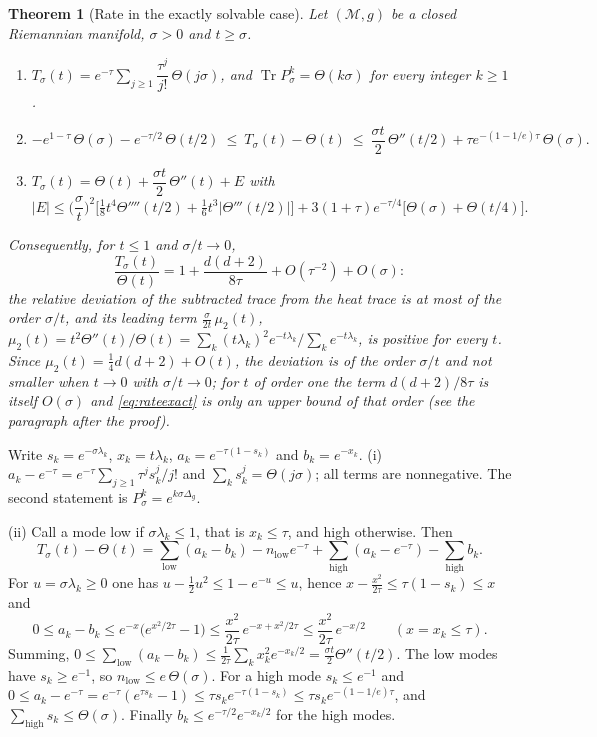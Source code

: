 \documentclass[11pt,a4paper]{article}
\makeatletter
\theoremstyle{stmt}
\newtheorem{theorem}{Theorem}[section]
\theoremstyle{defn}
\theoremstyle{rmk}
\renewenvironment{proof}[1][\proofname]{\par\pushQED{\qed}\normalfont\topsep6\p@\@plus6\p@\relax
  \trivlist\item[\hskip\labelsep{\sffamily\itshape\small #1.}]\ignorespaces}{\popQED\endtrivlist\@endpefalse}
\numberwithin{equation}{section}
\DeclareMathOperator{\Tr}{Tr}
\newcommand{\M}{\mathcal{M}}
\makeatother
\begin{document}
{\begin{theorem}[Rate in the exactly solvable case]\label{thm:rate}
Let $(\M,g)$ be a closed Riemannian manifold, $\sigma>0$ and $t\ge\sigma$.
\begin{enumerate}[label=\textup{(\roman*)}]
\item $T_\sigma(t)=e^{-\tau}\sum_{j\ge1}\dfrac{\tau^j}{j!}\,\Theta(j\sigma)$, and $\Tr P_\sigma^k=\Theta(k\sigma)$ for every integer $k\ge1$.
\item
\[
-e^{1-\tau}\,\Theta(\sigma)-e^{-\tau/2}\,\Theta(t/2)\ \le\ T_\sigma(t)-\Theta(t)\ \le\ \frac{\sigma t}{2}\,\Theta''(t/2)+\tau e^{-(1-1/e)\tau}\,\Theta(\sigma).
\]
\item $T_\sigma(t)=\Theta(t)+\dfrac{\sigma t}{2}\,\Theta''(t)+E$ with
\[
|E|\le\Big(\frac\sigma t\Big)^{2}\Big[\tfrac18t^4\Theta''''(t/2)+\tfrac16t^3|\Theta'''(t/2)|\Big]+3(1+\tau)e^{-\tau/4}\big[\Theta(\sigma)+\Theta(t/4)\big].
\]
\end{enumerate}
Consequently, for $t\le1$ and $\sigma/t\to0$,
\begin{equation}\label{eq:rateexact}
\frac{T_\sigma(t)}{\Theta(t)}=1+\frac{d(d+2)}{8\tau}+O(\tau^{-2})+O(\sigma):
\end{equation}
the relative deviation of the subtracted trace from the heat trace is at most of the order $\sigma/t$, and its leading term $\frac{\sigma}{2t}\,\mu_2(t)$, $\mu_2(t)=t^2\Theta''(t)/\Theta(t)=\sum_k(t\lambda_k)^2e^{-t\lambda_k}\big/\sum_ke^{-t\lambda_k}$, is positive for every $t$. Since $\mu_2(t)=\frac14d(d+2)+O(t)$, the deviation is of the order $\sigma/t$ and not smaller when $t\to0$ with $\sigma/t\to0$; for $t$ of order one the term $d(d+2)/8\tau$ is itself $O(\sigma)$ and \eqref{eq:rateexact} is only an upper bound of that order (see the paragraph after the proof).
\end{theorem}

\begin{proof}
Write $s_k=e^{-\sigma\lambda_k}$, $x_k=t\lambda_k$, $a_k=e^{-\tau(1-s_k)}$ and $b_k=e^{-x_k}$. (i) $a_k-e^{-\tau}=e^{-\tau}\sum_{j\ge1}\tau^js_k^j/j!$ and $\sum_ks_k^j=\Theta(j\sigma)$; all terms are nonnegative. The second statement is $P_\sigma^k=e^{k\sigma\Delta_g}$.

(ii) Call a mode low if $\sigma\lambda_k\le1$, that is $x_k\le\tau$, and high otherwise. Then
\[
T_\sigma(t)-\Theta(t)=\sum_{\mathrm{low}}(a_k-b_k)-n_{\mathrm{low}}e^{-\tau}+\sum_{\mathrm{high}}(a_k-e^{-\tau})-\sum_{\mathrm{high}}b_k .
\]
For $u=\sigma\lambda_k\ge0$ one has $u-\tfrac12u^2\le1-e^{-u}\le u$, hence $x-\tfrac{x^2}{2\tau}\le\tau(1-s_k)\le x$ and
\[
0\le a_k-b_k\le e^{-x}\big(e^{x^2/2\tau}-1\big)\le\frac{x^2}{2\tau}\,e^{-x+x^2/2\tau}\le\frac{x^2}{2\tau}\,e^{-x/2}\qquad(x=x_k\le\tau).
\]
Summing, $0\le\sum_{\mathrm{low}}(a_k-b_k)\le\frac{1}{2\tau}\sum_kx_k^2e^{-x_k/2}=\frac{\sigma t}{2}\Theta''(t/2)$. The low modes have $s_k\ge e^{-1}$, so $n_{\mathrm{low}}\le e\,\Theta(\sigma)$. For a high mode $s_k\le e^{-1}$ and $0\le a_k-e^{-\tau}=e^{-\tau}(e^{\tau s_k}-1)\le\tau s_ke^{-\tau(1-s_k)}\le\tau s_ke^{-(1-1/e)\tau}$, and $\sum_{\mathrm{high}}s_k\le\Theta(\sigma)$. Finally $b_k\le e^{-\tau/2}e^{-x_k/2}$ for the high modes.


\end{proof}}
\end{document}

